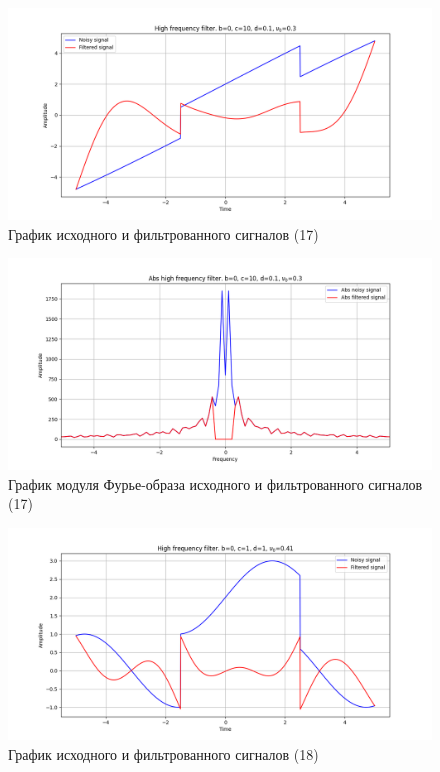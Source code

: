 \documentclass[a4paper, 12pt]{article}
\begin{document}
    \begin{figure}[!htb]
        \centering
        \includegraphics[scale=0.48]{17_u_flt_u_nolow.png}
        \captionsetup{skip=0pt}
        \caption{График исходного и фильтрованного сигналов (17)}
        \label{fig:fig59}
    \end{figure}
    \begin{figure}[!htb]
        \centering
        \includegraphics[scale=0.48]{17_abs_u_U_nolow.png}
        \captionsetup{skip=0pt}
        \caption{График модуля Фурье-образа исходного и фильтрованного сигналов (17)}
        \label{fig:fig60}
    \end{figure}
    \begin{figure}[!htb]
        \centering
        \includegraphics[scale=0.48]{18_u_flt_u_nolow.png}
        \captionsetup{skip=0pt}
        \caption{График исходного и фильтрованного сигналов (18)}
        \label{fig:fig61}
    \end{figure}
\end{document}
